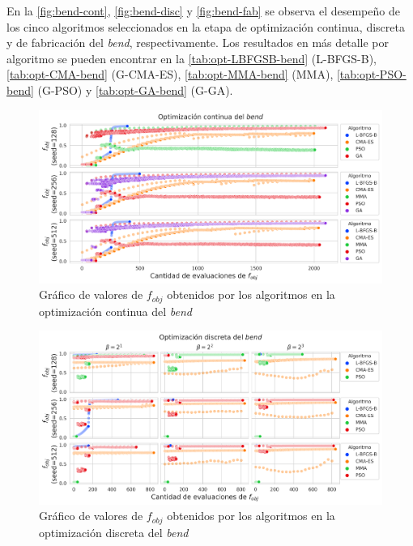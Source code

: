 En la \autoref{fig:bend-cont}, \autoref{fig:bend-disc} y \autoref{fig:bend-fab} se observa 
el desempeño de los cinco algoritmos seleccionados en la etapa de optimización continua, discreta y
de fabricación del \emph{bend}, respectivamente.
Los resultados en más detalle por algoritmo se pueden encontrar en la 
\autoref{tab:opt-LBFGSB-bend} (L-BFGS-B),
\autoref{tab:opt-CMA-bend} (G-CMA-ES),
\autoref{tab:opt-MMA-bend} (MMA),
\autoref{tab:opt-PSO-bend} (G-PSO) y
\autoref{tab:opt-GA-bend} (G-GA).

\begin{landscape}
\begin{figure}[ht]
  \centering
  \includegraphics[scale=1.0]{image/results/bend/bend-opt-cont.png}
  \caption{Gráfico de valores de $f_{obj}$ obtenidos por los algoritmos en la optimización continua del \emph{bend}}
  \label{fig:bend-cont}
\end{figure}
\end{landscape}

\begin{landscape}
\begin{figure}[ht]
  \centering
  \includegraphics[scale=1.0]{image/results/bend/bend-opt-disc.png}
  \caption{Gráfico de valores de $f_{obj}$ obtenidos por los algoritmos en la optimización discreta del \emph{bend}}
  \label{fig:bend-disc}
\end{figure}
\end{landscape}

